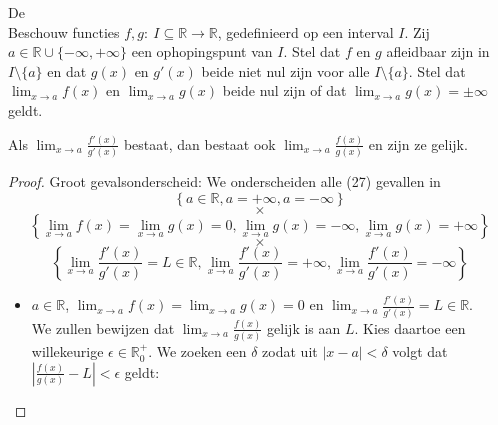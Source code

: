 \documentclass[main.tex]{subfiles}
\begin{document}
\begin{st}
  De \\
  Beschouw functies $f,g:\ I \subseteq \mathbb{R} \rightarrow \mathbb{R}$, gedefinieerd op een interval $I$.
  Zij $a\in \mathbb{R} \cup \{-\infty,+\infty\}$ een ophopingspunt van $I$.
  Stel dat $f$ en $g$ afleidbaar zijn in $I \setminus \{a\}$ en dat $g(x)$ en $g'(x)$ beide niet nul zijn voor alle $I \setminus \{a\}$.
  Stel dat $\lim_{x\rightarrow a}f(x)$ en $\lim_{x\rightarrow a}g(x)$ beide nul zijn of dat $\lim_{x\rightarrow a}g(x) = \pm\infty$ geldt.
  \begin{center}
    Als $\lim_{x\rightarrow a}\frac{f'(x)}{g'(x)}$ bestaat, dan bestaat ook $\lim_{x\rightarrow a}\frac{f(x)}{g(x)}$ en zijn ze gelijk.
  \end{center}

  \begin{proof}
    Groot gevalsonderscheid:
    We onderscheiden alle (27) gevallen in
    \[
    \left\{ a \in \mathbb{R}, a = +\infty, a = -\infty \right\}
    \]\[\times\]\[
    \left\{ \lim_{x\rightarrow a}f(x) = \lim_{x\rightarrow a}g(x) = 0, \lim_{x\rightarrow a}g(x) =-\infty ,\lim_{x\rightarrow a}g(x) =+\infty  \right\}
    \]\[\times\]\[
    \left\{ \lim_{x\rightarrow a}\frac{f'(x)}{g'(x)} = L \in \mathbb{R}, \lim_{x\rightarrow a}\frac{f'(x)}{g'(x)} = +\infty, \lim_{x\rightarrow a}\frac{f'(x)}{g'(x)} = -\infty \right\}
    \]

    \begin{itemize}
    \item $a\in \mathbb{R}$, $\lim_{x\rightarrow a}f(x) = \lim_{x\rightarrow a}g(x) = 0$ en $\lim_{x\rightarrow a}\frac{f'(x)}{g'(x)} = L \in \mathbb{R}$.\\
      We zullen bewijzen dat $\lim_{x\rightarrow a}\frac{f(x)}{g(x)}$ gelijk is aan $L$.
      Kies daartoe een willekeurige $\epsilon \in \mathbb{R}_{0}^{+}$.
      We zoeken een $\delta$ zodat uit $|x-a|< \delta$ volgt dat $|\frac{f(x)}{g(x)}-L|<\epsilon$ geldt:


\end{itemize}
\end{proof}
\end{st}
\end{document}

